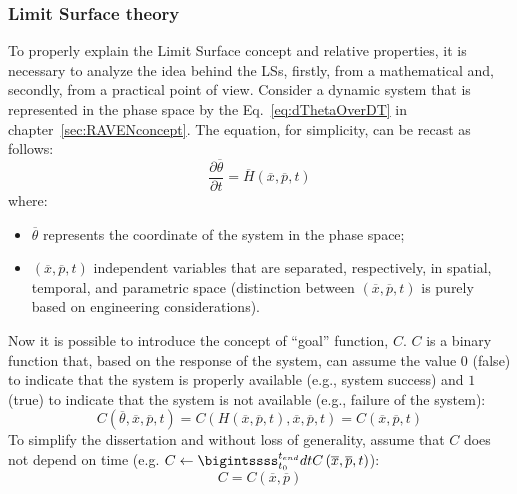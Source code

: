 \subsubsection{Limit Surface theory}
\label{sec:LSconcept}	

To properly explain the Limit Surface concept and relative properties, 
it is necessary to analyze the idea behind the LSs, firstly, from a 
mathematical and, secondly, from a practical point of view.
Consider a dynamic system that is represented in the phase space by the Eq.~\ref{eq:dThetaOverDT} in chapter~\ref{sec:RAVENconcept}. 
The equation, for simplicity, can be recast as follows:
\begin{equation}
\label{eq:ThetaXPT}
\frac{\partial \overline{\theta} }{\partial t}=\overline{H}\left (  \overline{x},\overline{p},t \right )
\end{equation}
where:
\begin{itemize}
  \item $\overline{\theta}$ represents the coordinate of the system in the 
  phase space;
  \item $\left (  \overline{x},\overline{p},t \right )$ independent variables 
  that are separated, respectively, in spatial, temporal, and parametric  
  space (distinction between $\left (  \overline{x},\overline{p},t \right )$ is purely based on engineering considerations).
\end{itemize}
Now it is possible to introduce the concept of ``goal'' function, $C$. $C$ 
is a binary function that, based on the response of the system, can 
assume the value $0$ (false) to indicate that the system is properly 
available (e.g., system success) and $1$ (true) to indicate that the 
system is not available (e.g., failure of the system):
\begin{equation}
C\left (\overline{\theta}, \overline{x},\overline{p},t \right ) = C\left (H\left(\overline{x},\overline{p},t \right), \overline{x},\overline{p},t \right ) = C\left ( \overline{x},\overline{p},t \right ) 
\end{equation}
To simplify the dissertation  and without loss of generality, assume 
that $C$ does not depend on time (e.g. $C\leftarrow 
\bigintssss_{t_{0}}^{t_{end}}dtC\left(  \overline{x},\overline{p},t \right )$):
\begin{equation}
  \label{eq:goalFunction}
  C = C\left (\overline{x},\overline{p}\right ) 
\end{equation}
